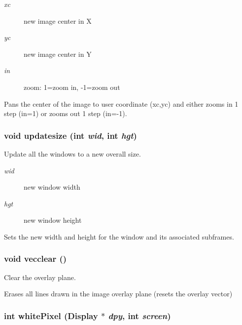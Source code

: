 \begin{Desc}
\item[Parameters:]
\begin{description}
\item[{\em xc}]new image center in X \item[{\em yc}]new image center in Y \item[{\em in}]zoom: 1=zoom in, -1=zoom out\end{description}
\end{Desc}
Pans the center of the image to user coordinate (xc,yc) and either zooms in 1 step (in=1) or zooms out 1 step (in=-1). 
\subsubsection{\setlength{\rightskip}{0pt plus 5cm}void updatesize (int {\em wid}, int {\em hgt})}\label{xtvutils_8c_a192}


Update all the windows to a new overall size. 

\begin{Desc}
\item[Parameters:]
\begin{description}
\item[{\em wid}]new window width \item[{\em hgt}]new window height\end{description}
\end{Desc}
Sets the new width and height for the window and its associated subframes. 
\subsubsection{\setlength{\rightskip}{0pt plus 5cm}void vecclear ()}\label{xtvutils_8c_a181}


Clear the overlay plane. 

Erases all lines drawn in the image overlay plane (resets the overlay vector) 
\subsubsection{\setlength{\rightskip}{0pt plus 5cm}int white\-Pixel (Display $\ast$ {\em dpy}, int {\em screen})}\label{xtvutils_8c_a223}



